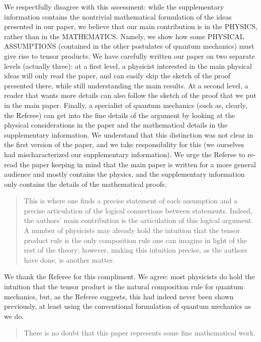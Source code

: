 \documentclass[11pt]{article}
\begin{document}
We respectfully disagree with this assessment: while the supplementary
information contains the nontrivial mathematical formulation of the
ideas presented in our paper, we believe that our main contribution is
in the PHYSICS, rather than in the MATHEMATICS. Namely, we show how
some PHYSICAL ASSUMPTIONS (contained in the other postulates of
quantum mechanics) must give rise to tensor products. We have
carefully written our paper on two separate levels (actually three):
at a first level, a physicist interested in the main physical ideas
will only read the paper, and can easily skip the sketch of the proof
presented there, while still understanding the main results. At a
second level, a reader that wants more details can also follow the
sketch of the proof that we put in the main paper. Finally, a
specialist of quantum mechanics (such as, clearly, the Referee) can
get into the fine details of the argument by looking at the physical
considerations in the paper and the mathematical details in the
supplementary information. We understand that this distinction was not
clear in the first version of the paper, and we take
responsibility for this (we ourselves had mischaracterized our
supplementary information). We urge the Referee to re-read the paper
keeping in mind that the main paper is written for a more general
audience and mostly contains the physics, and the supplementary
information only contains the details of the mathematical proofs.
\begin{quote}
This is where one finds a precise statement of each
assumption and a precise articulation of the logical connections
between statements. Indeed, the authors' main contribution is the
articulation of this logical argument. A number of physicists may
already hold the intuition that the tensor product rule is the only
composition rule one can imagine in light of the rest of the theory;
however, making this intuition precise, as the authors have done, is
another matter.\end{quote}

We thank the Referee for this compliment. We agree: most physicists do
hold the intuition that the tensor product is the natural composition
rule for quantum mechanics, but, as the Referee suggests, this had
indeed never been shown previously, at least using the conventional
formulation of quantum mechanics as we do.

\begin{quote}There is no doubt that this paper represents some fine
mathematical work.\end{quote}
\end{document}
